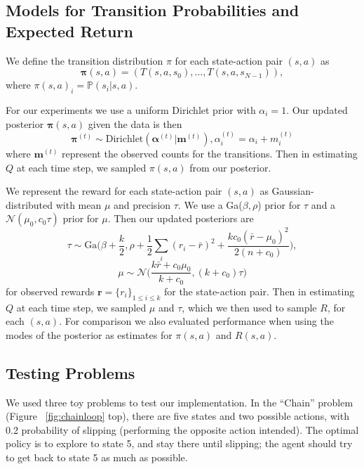 \documentclass[10pt, twocolumn, twoside]{article}
\begin{document}
\subsection{Models for Transition Probabilities and Expected Return}
We define the transition distribution $\pi$ for each state-action pair $(s, a)$ as
\begin{equation*}
\mathbf{\pi}(s, a) = (T(s, a, s_0), ..., T(s, a, s_{N-1})),
\end{equation*}
where $\pi(s, a)_i = \mathbb{P}(s_i| s, a)$.

For our experiments we use a uniform Dirichlet prior with $\alpha_i = 1$.
Our updated posterior $\mathbf{\pi}(s, a)$ given the data is then
\begin{equation*}
\mathbf{\pi}^{(t)} \sim \textrm{Dirichlet}(\mathbf{\alpha}^{(t)}| \mathbf{m}^{(t)}),
\alpha^{(t)}_i = \alpha_i + m_i^{(t)}
\end{equation*}
where $\mathbf{m}^{(t)}$ represent the observed counts for the transitions. Then in estimating $Q$ at each time step, we sampled $\pi(s, a)$ from our posterior.

We represent the reward for each state-action pair $(s, a)$ as Gaussian-
distributed with mean $\mu$ and precision $\tau$. We use a Ga($\beta,\rho$)
prior for $\tau$ and a $\mathcal{N}(\mu_0, c_0\tau)$ prior for $\mu$. Then our
updated posteriors are
$$\tau \sim \textrm{Ga}\Big(\beta + \frac{k}{2}, \rho + \frac{1}{2}\sum_i(r_i - \bar{r})^2
+ \frac{kc_0(\bar{r}-\mu_0)^2}{2(n+c_0)}\Big),$$
$$\mu \sim \mathcal{N}\Big(\frac{k\bar{r} + c_0\mu_0}{k + c_0}, (k+c_0)\tau\Big)$$
for observed rewards $\mathbf{r} = \{r_i\}_{1\le i \le k}$ for the state-action pair.
Then in estimating $Q$ at each time step, we sampled $\mu$ and $\tau$, which we then used
to sample $R$, for each $(s, a)$.
For comparison we also evaluated performance when using the modes of the posterior as
estimates for $\pi(s, a)$ and $R(s,a)$.

\subsection{Testing Problems}
We used three toy problems to test our implementation. In the ``Chain'' problem
(Figure ~\ref{fig:chainloop} top), there are five states and two possible actions, with 0.2
probability of slipping (performing the opposite action intended). The optimal
policy is to explore to state 5, and stay there until slipping; the agent should try
to get back to state 5 as much as possible.
\end{document}
